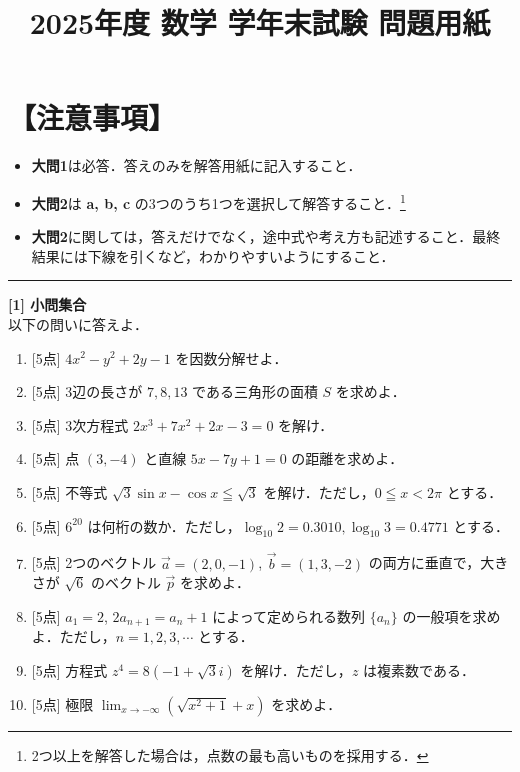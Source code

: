\documentclass{jlreq}
\theoremstyle{definition}
\begin{document}
\title{2025年度 数学 学年末試験 問題用紙}
\date{}
\author{}
\maketitle

\section*{【注意事項】}
\begin{itemize}
    \item \textbf{大問1}は必答．答えのみを解答用紙に記入すること．
    \item \textbf{大問2}は \textbf{a, b, c} の3つのうち1つを選択して解答すること．\footnote{2つ以上を解答した場合は，点数の最も高いものを採用する．}
    \item \textbf{大問2}に関しては，答えだけでなく，途中式や考え方も記述すること．最終結果には下線を引くなど，わかりやすいようにすること．
\end{itemize}
\hrule
\vspace{10mm}

\noindent\textbf{\large [1] 小問集合 }\\

以下の問いに答えよ．

\begin{enumerate}[label=(\arabic*)]
    \item{[5点]} $4x^2-y^2+2y-1$ を因数分解せよ．
    \vspace{3mm}
    \item{[5点]} 3辺の長さが $7, 8, 13$ である三角形の面積 $S$ を求めよ．
    \vspace{3mm}
    \item{[5点]} 3次方程式 $2x^3+7x^2+2x-3=0$ を解け．
    \vspace{3mm}
    \item{[5点]} 点 $(3,-4)$ と直線 $5x-7y+1=0$ の距離を求めよ．
    \vspace{3mm}
    \item{[5点]} 不等式 $\sqrt{3}\sin x-\cos x\leqq \sqrt{3}$ を解け．ただし，$0\leqq x< 2\pi$ とする．
    \vspace{3mm}
    \item{[5点]} $6^{20}$ は何桁の数か．ただし，$\log_{10} 2=0.3010, \log_{10} 3=0.4771$ とする．
    \vspace{3mm}
    \item{[5点]} 2つのベクトル $\vec{a}=(2,0,-1)$, $\vec{b}=(1,3,-2)$ の両方に垂直で，大きさが $\sqrt{6}$ のベクトル $\vec{p}$ を求めよ． 
    \vspace{3mm}
    \item{[5点]} $a_1=2$, $2a_{n+1}=a_n+1$ によって定められる数列 $\{a_n\}$ の一般項を求めよ．ただし，$n=1, 2, 3, \cdots $ とする．
    \vspace{3mm}
    \item{[5点]} 方程式 $z^4=8(-1+\sqrt{3}i )$ を解け．ただし，$z$ は複素数である．
    \vspace{3mm}
    \item{[5点]} 極限 $\displaystyle\lim_{x \to -\infty} (\sqrt{x^2+1}+x)$ を求めよ．
\end{enumerate}
\end{document}
